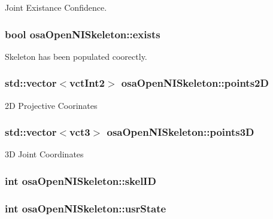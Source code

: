 Joint Existance Confidence. 

\hypertarget{classosa_open_n_i_skeleton_aaad274b86c6213c48c1aa2bdcd053195}{
\subsubsection[{exists}]{\setlength{\rightskip}{0pt plus 5cm}bool osa\-Open\-N\-I\-Skeleton\-::exists}}\label{classosa_open_n_i_skeleton_aaad274b86c6213c48c1aa2bdcd053195}


Skeleton has been populated coorectly. 

\hypertarget{classosa_open_n_i_skeleton_af72455ac2eb4611fefc465d08a415b59}{
\subsubsection[{points2\-D}]{\setlength{\rightskip}{0pt plus 5cm}std\-::vector$<${\bf vct\-Int2}$>$ osa\-Open\-N\-I\-Skeleton\-::points2\-D}}\label{classosa_open_n_i_skeleton_af72455ac2eb4611fefc465d08a415b59}


2\-D Projective Coorinates 

\hypertarget{classosa_open_n_i_skeleton_a69590f30ce352cd80be31757dcea8351}{
\subsubsection[{points3\-D}]{\setlength{\rightskip}{0pt plus 5cm}std\-::vector$<${\bf vct3}$>$ osa\-Open\-N\-I\-Skeleton\-::points3\-D}}\label{classosa_open_n_i_skeleton_a69590f30ce352cd80be31757dcea8351}


3\-D Joint Coordinates 

\hypertarget{classosa_open_n_i_skeleton_acff0bacc1bc0f3411a2ee8ebd541e1b9}{
\subsubsection[{skel\-I\-D}]{\setlength{\rightskip}{0pt plus 5cm}int osa\-Open\-N\-I\-Skeleton\-::skel\-I\-D}}\label{classosa_open_n_i_skeleton_acff0bacc1bc0f3411a2ee8ebd541e1b9}
\hypertarget{classosa_open_n_i_skeleton_afd56b36e28cdc37b1f8e9e028537af41}{
\subsubsection[{usr\-State}]{\setlength{\rightskip}{0pt plus 5cm}int osa\-Open\-N\-I\-Skeleton\-::usr\-State}}\label{classosa_open_n_i_skeleton_afd56b36e28cdc37b1f8e9e028537af41}


